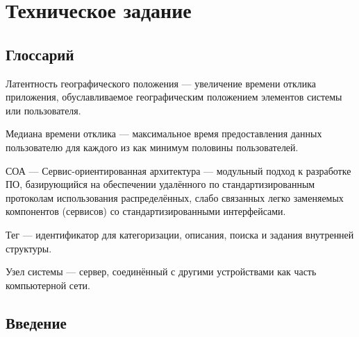 \documentclass{bmstu-gost-7-32}
\begin{document}
\chapter*{Техническое задание}

\section*{Глоссарий}

Латентность географического положения — увеличение времени отклика приложения, обуславливаемое географическим положением элементов системы или пользователя.

Медиана времени отклика — максимальное время предоставления данных пользователю для каждого из как минимум половины пользователей.

СОА — Сервис-ориентированная архитектура — модульный подход к разработке ПО, базирующийся на обеспечении удалённого по стандартизированным протоколам использования распределённых, слабо связанных легко заменяемых компонентов (сервисов) со стандартизированными интерфейсами.

Тег — идентификатор для категоризации, описания, поиска и задания внутренней структуры.

Узел системы — сервер, соединённый с другими устройствами как часть компьютерной сети.


\section{Введение}


\end{document}
